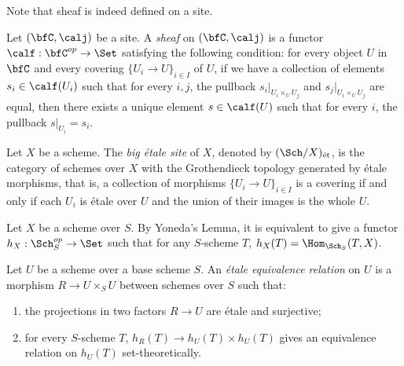    Note that sheaf is indeed defined on a site.

    \begin{definition}\label{def:sheaves_on_site}
        Let \((\bfC, \calj)\) be a site.
        A \emph{sheaf} on \((\bfC, \calj)\) is a functor \(\calf: \bfC^{op} \to \Set\) satisfying the following condition:
        for every object \(U\) in \(\bfC\) and every covering \(\{U_i \to U\}_{i \in I}\) of \(U\), 
        if we have a collection of elements \(s_i \in \calf(U_i)\) such that for every \(i,j\), 
        the pullback \(s_i|_{U_i \times_U U_j}\) and \(s_j|_{U_i \times_U U_j}\) are equal, 
        then there exists a unique element \(s \in \calf(U)\) such that for every \(i\), the pullback \(s|_{U_i} = s_i\).
    \end{definition}

    \begin{definition}\label{def:big_etale_site}
        Let \(X\) be a scheme.
        The \emph{big \'etale site} of \(X\), denoted by \((\Sch/X)_{\text{\'et}}\), is the category of schemes over \(X\) with the Grothendieck topology generated by \'etale morphisms,
        that is, a collection of morphisms \(\{U_i \to U\}_{i \in I}\) is a covering if and only if each \(U_i\) is \'etale over \(U\) and the union of their images is the whole \(U\).
    \end{definition}

    Let \(X\) be a scheme over \(S\).
    By Yoneda's Lemma, it is equivalent to give a functor \(h_X: \Sch_S^{op} \to \Set\) such that for any \(S\)-scheme \(T\), \(h_X(T) = \Hom_{\Sch_S}(T, X)\).

    \begin{definition}\label{def:etale_equivalent_relation}
        Let \(U\) be a scheme over a base scheme \(S\).
        An \emph{\'etale equivalence relation} on \(U\) is a morphism \(R \to U \times_S U\) between schemes over \(S\) such that:
        \begin{enumerate}
            \item the projections in two factors \(R \to U\) are \'etale and surjective;
            \item for every \(S\)-scheme \(T\), \(h_R(T) \to h_U(T) \times h_U(T)\) gives an equivalence relation on \(h_U(T)\) set-theoretically.
        \end{enumerate}
    \end{definition}

